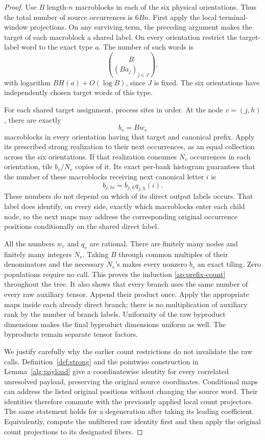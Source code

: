 \begin{proof}
Use \(B\) length-\(n\) macroblocks in each of the six physical
orientations.  Thus the total number of source occurrences is \(6Bn\).
First apply the local terminal-window projections.  On any surviving
term, the preceding argument makes the target of each macroblock a
shared label.  On every orientation restrict the target-label word to
the exact type \(a\).  The number of such words is
\[
 \binom B{(Ba_j)_{j\in J}},
\]
with logarithm \(BH(a)+O(\log B)\), since \(J\) is fixed.  The
six orientations have independently chosen target words of this type.

For each shared target assignment, process sites in order.  At the node
\(v=(j,h)\), there are exactly
\[
 b_v=Bw_v
\]
macroblocks in every orientation having that target and canonical prefix.
Apply its prescribed strong realization to their next occurrences, as an
equal collection across the six orientations.  If that realization consumes
\(N_v\) occurrences in each orientation, tile \(b_v/N_v\) copies of
it.  Its exact per-bank histogram guarantees that the number of these
macroblocks receiving next canonical letter \(i\) is
\begin{equation}\label{ap:prefix-count}
 b_{j,hi}=b_{j,h}q_{j,h}(i).
\end{equation}
These numbers do not depend on which of its direct output labels occurs.
That label does identify, on every side, exactly which macroblocks enter
each child node, so the next maps may address the corresponding original
occurrence positions conditionally on the shared direct label.

All the numbers \(w_v\) and \(q_v\) are rational.  There are finitely
many nodes and finitely many integers \(N_v\).  Taking \(B\) through
common multiples of their denominators and the necessary \(N_v\)'s
makes every nonzero \(b_v\) an exact tiling.  Zero populations require
no call.  This proves the induction \eqref{ap:prefix-count} throughout
the tree.  It also shows that every branch uses the same number of every
raw auxiliary tensor.  Append their product once.  Apply the appropriate
maps inside each already direct branch; there is no multiplication of
auxiliary rank by the number of branch labels.  Uniformity of the raw
byproduct dimensions makes the final byproduct dimensions uniform as
well.  The byproducts remain separate tensor factors.

We justify carefully why the earlier count restrictions do not invalidate
the raw calls.  Definition~\ref{def:strong} and the pointwise construction
in Lemma~\ref{alg:payload} give a coordinatewise
identity for every correlated unresolved payload, preserving the original
source coordinates.  Conditional maps can address the listed original
positions without changing the source word.  Their identities therefore
commute with the previously applied local count projectors.  The same
statement holds for a degeneration after taking its leading coefficient.
Equivalently, compute the unfiltered raw identity first and then apply
the original count projections to its designated fibers.


\end{proof}
